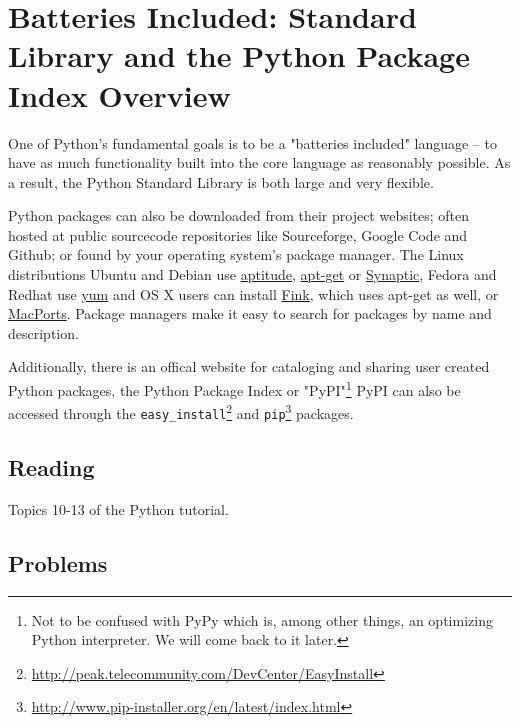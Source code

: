 \documentclass{report}
\begin{document}
\section{ Batteries Included: Standard Library and the Python Package Index Overview}

One of Python's fundamental goals is to be a "batteries included" language -- to have as much functionality built into the core language as reasonably possible. As a result, the Python Standard Library is both large and very flexible. 

Python packages can also be downloaded from their project websites; often hosted at public sourcecode repositories like Sourceforge, Google Code and Github; or found by your operating system's \gls{package manager}. The Linux distributions Ubuntu and Debian use \href{http://wiki.debian.org/Aptitude?action=show&redirect=aptitude}{aptitude}, \href{http://wiki.debian.org/Apt}{apt-get} or \href{https://help.ubuntu.com/community/SynapticHowto}{Synaptic}, Fedora and Redhat use \href{http://yum.baseurl.org/}{yum} and OS X users can install \href{http://www.finkproject.org/}{Fink}, which uses apt-get as well, or \href{http://www.macports.org/index.php}{MacPorts}. Package managers make it easy to search for packages by name and description.

Additionally, there is an offical website for cataloging and sharing user created Python packages, the Python Package Index or "PyPI"\footnote{Not to be confused with PyPy which is, among other things, an optimizing Python interpreter. We will come back to it later.} PyPI can also be accessed through the \verb|easy_install|\footnote{\url{http://peak.telecommunity.com/DevCenter/EasyInstall}} and \verb|pip|\footnote{\url{http://www.pip-installer.org/en/latest/index.html}} packages.

\subsection{Reading}
Topics 10-13 of the Python tutorial.  

\subsection{Problems}
\end{document}
